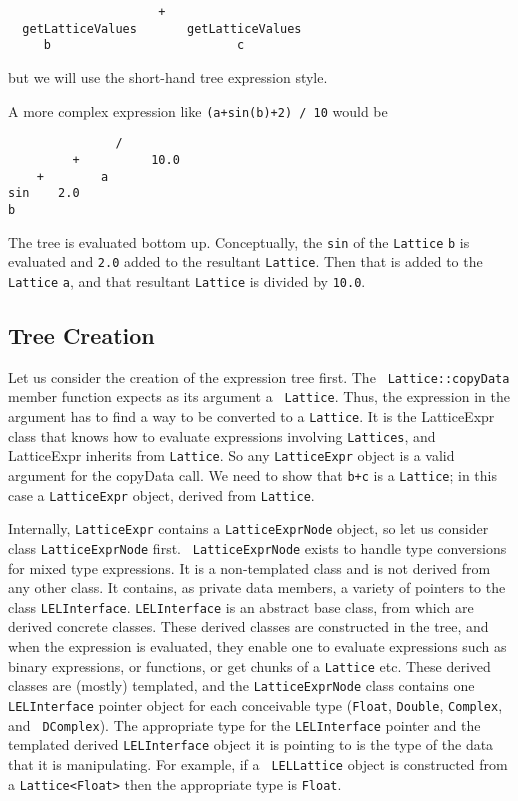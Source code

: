 \begin{verbatim}
                     +
  getLatticeValues       getLatticeValues
     b                          c
\end{verbatim}

but we will use the short-hand tree expression style.

A more complex expression like  {\tt (a+sin(b)+2) / 10}
would be

\begin{verbatim}
               / 
         +          10.0
    +        a
sin    2.0
b
\end{verbatim}

The tree is evaluated bottom up.  Conceptually, the {\tt sin} of the {\tt Lattice}
{\tt b} is evaluated and {\tt 2.0} added to the resultant {\tt Lattice}.  Then that
is added to the {\tt Lattice} {\tt a}, and that resultant {\tt Lattice} is divided
by {\tt 10.0}.




\subsection {Tree Creation}

Let us consider the creation of the expression tree first.  The {\tt
Lattice::copyData} member function expects as its argument a {\tt
Lattice}.  Thus, the expression in the argument has to find a way to be
converted to a {\tt Lattice}.  It is the LatticeExpr class that knows
how to evaluate expressions involving {\tt Lattices}, and LatticeExpr
inherits from {\tt Lattice}.  So any {\tt LatticeExpr} object is a valid
argument for the copyData call.  We need to show that {\tt b+c} is a
{\tt Lattice}; in this case a {\tt LatticeExpr} object, derived from
{\tt Lattice}. 

Internally, {\tt LatticeExpr} contains a {\tt LatticeExprNode} object,
so let us consider class {\tt LatticeExprNode} first.  {\tt
LatticeExprNode} exists to handle type conversions for mixed type
expressions.  It is a non-templated class and is not derived from any
other class.  It contains, as private data members, a variety of
pointers to the class {\tt LELInterface}.  {\tt LELInterface} is an
abstract base class, from which are derived concrete classes.  These
derived classes are constructed in the tree, and when the expression is
evaluated, they enable one to evaluate expressions such as binary
expressions, or functions, or get chunks of a {\tt Lattice} etc.  These
derived classes are (mostly) templated, and the {\tt LatticeExprNode}
class contains one {\tt LELInterface} pointer object for each
conceivable type ({\tt Float}, {\tt Double}, {\tt Complex}, and {\tt
DComplex}).  The appropriate type for the {\tt LELInterface} pointer and
the templated derived {\tt LELInterface} object it is pointing to is the
type of the data that it is manipulating.  For example, if a {\tt
LELLattice} object is constructed from a {\tt Lattice<Float>} then the
appropriate type is {\tt Float}. 

